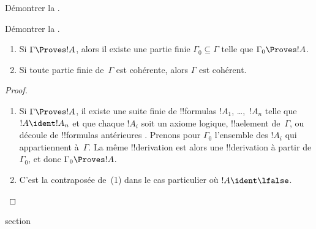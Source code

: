 \documentclass[11pt,a4paper,openany]{memoir}
\begin{document}
\begin{prob}
Démontrer la .
\end{prob}
\tagendprob

\begin{prob}
Démontrer la .
\end{prob}
\tagendprob

\begin{prop}[Compacité]
\begin{enumerate}
\item Si $\Gamma \Proves !A$, alors il existe une partie finie
  $\Gamma_0 \subseteq \Gamma$ telle que $\Gamma_0 \Proves !A$.
\item Si toute partie finie de~$\Gamma$ est cohérente, alors
  $\Gamma$ est cohérent.
\end{enumerate}
\end{prop}

\begin{proof}
\begin{enumerate}
\item Si $\Gamma \Proves !A$, il existe une suite finie de !!{formula}s
  $!A_1$, \dots,~$!A_n$ telle que $!A \ident !A_n$ et que chaque
  $!A_i$ soit un axiome logique, !!a{element} de~$\Gamma$, ou découle
  de !!{formula}s antérieures
  . Prenons pour
  $\Gamma_0$ l'ensemble des $!A_i$ qui appartiennent à~$\Gamma$.
  La même !!{derivation} est alors une !!{derivation} à partir de
  $\Gamma_0$, et donc $\Gamma_0 \Proves !A$.
\item C'est la contraposée de~(1) dans le cas particulier où
  $!A \ident \lfalse$.
\end{enumerate}
\end{proof}



\endgroup



\begingroup
\expandafter\def\csname ol@sectioncs\endcsname{section}
\def\olfilename{deduction-theorem}
\end{document}
